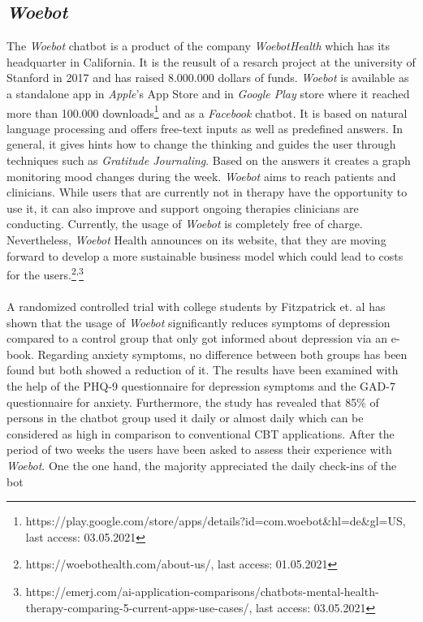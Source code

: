 \documentclass[sigconf, nonacm]{acmart}
\begin{document}
\subsection{\emph{Woebot}}
The \emph{Woebot} chatbot is a product of the company \emph{WoebotHealth} which has its headquarter in California. It is the reusult of a resarch 
project at the university of Stanford in 2017 and has raised 8.000.000 dollars of funds.
\emph{Woebot} is available as a standalone app in \emph{Apple}'s App Store and in \emph{Google Play} store where it reached more than 100.000 downloads\footnote{https://play.google.com/store/apps/details?id=com.woebot\&hl=de\&gl=US, last access: 03.05.2021} and as 
a \emph{Facebook} chatbot. It is based on natural language processing and offers free-text inputs as well as predefined answers.
In general, it gives hints how to change the thinking and guides the user through techniques such as \emph{Gratitude Journaling}. 
Based on the answers it creates a graph monitoring mood changes during the week.
\emph{Woebot} aims to reach patients and clinicians. While users that are currently not in therapy have the opportunity to use it,
it can also improve and support ongoing therapies clinicians are conducting.
Currently, the usage of \emph{Woebot} is completely free of charge. Nevertheless, \emph{Woebot} Health announces on its website, that they are moving forward
to develop a more sustainable business model which could lead to costs for the users.\footnote{https://woebothealth.com/about-us/, last access: 01.05.2021}\textsuperscript{,}\footnote{https://emerj.com/ai-application-comparisons/chatbots-mental-health-therapy-comparing-5-current-apps-use-cases/, last access: 03.05.2021}
\\\\
A randomized controlled trial with college students by Fitzpatrick et. al \cite{Fitzpatrick2017} has shown that the usage of \emph{Woebot} significantly reduces
symptoms of depression compared to a control group that only got informed about depression via an e-book. Regarding anxiety symptoms, no difference between
both groups has been found but both showed a reduction of it. The results have been examined with the help of the PHQ-9 questionnaire for depression symptoms and the GAD-7 questionnaire for anxiety. Furthermore, the study has revealed that 85\% of persons in the chatbot group used 
it daily or almost daily which can be considered as high in comparison to conventional CBT applications\cite{Ludden2015}.
After the period of two weeks the users have been asked to assess their experience with \emph{Woebot}. One the one hand, the majority appreciated the daily check-ins of the bot 
\end{document}
